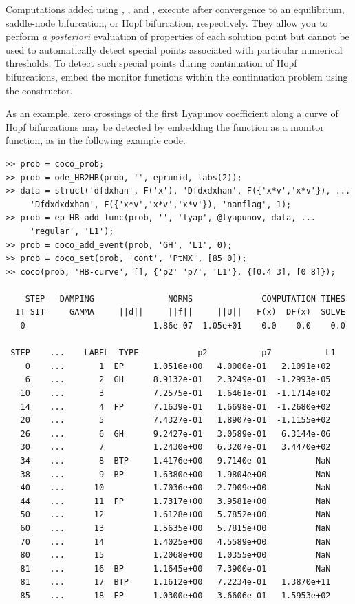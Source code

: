 Computations added using , , and ,  execute after convergence to an equilibrium, saddle-node bifurcation, or Hopf bifurcation, respectively. They allow you to perform \textit{a posteriori} evaluation of properties of each solution point but cannot be used to automatically detect special points associated with particular numerical thresholds. To detect such special points during continuation of Hopf bifurcations, embed the monitor functions within the continuation problem using the  constructor. 

As an example, zero crossings of the first Lyapunov coefficient along a curve of Hopf bifurcations may be detected by embedding the  function as a  monitor function, as in the following example code.
\begin{lstlisting}[language=coco-highlight,frame=lines]
>> prob = coco_prob;
>> prob = ode_HB2HB(prob, '', eprunid, labs(2));
>> data = struct('dfdxhan', F('x'), 'Dfdxdxhan', F({'x*v','x*v'}), ...
     'Dfdxdxdxhan', F({'x*v','x*v','x*v'}), 'nanflag', 1);
>> prob = ep_HB_add_func(prob, '', 'lyap', @lyapunov, data, ...
     'regular', 'L1');
>> prob = coco_add_event(prob, 'GH', 'L1', 0);
>> prob = coco_set(prob, 'cont', 'PtMX', [85 0]);
>> coco(prob, 'HB-curve', [], {'p2' 'p7', 'L1'}, {[0.4 3], [0 8]});

    STEP   DAMPING               NORMS              COMPUTATION TIMES
  IT SIT     GAMMA     ||d||     ||f||     ||U||   F(x)  DF(x)  SOLVE
   0                          1.86e-07  1.05e+01    0.0    0.0    0.0

 STEP    ...    LABEL  TYPE            p2           p7           L1
    0    ...       1  EP      1.0516e+00   4.0000e-01   2.1091e+02
    6    ...       2  GH      8.9132e-01   2.3249e-01  -1.2993e-05
   10    ...       3          7.2575e-01   1.6461e-01  -1.1714e+02
   14    ...       4  FP      7.1639e-01   1.6698e-01  -1.2680e+02
   20    ...       5          7.4327e-01   1.8907e-01  -1.1155e+02
   26    ...       6  GH      9.2427e-01   3.0589e-01   6.3144e-06
   30    ...       7          1.2430e+00   6.3207e-01   3.4470e+02
   34    ...       8  BTP     1.4176e+00   9.7140e-01          NaN
   38    ...       9  BP      1.6380e+00   1.9804e+00          NaN
   40    ...      10          1.7036e+00   2.7909e+00          NaN
   44    ...      11  FP      1.7317e+00   3.9581e+00          NaN
   50    ...      12          1.6128e+00   5.7852e+00          NaN
   60    ...      13          1.5635e+00   5.7815e+00          NaN
   70    ...      14          1.4025e+00   4.5589e+00          NaN
   80    ...      15          1.2068e+00   1.0355e+00          NaN
   81    ...      16  BP      1.1645e+00   7.3900e-01          NaN
   81    ...      17  BTP     1.1612e+00   7.2234e-01   1.3870e+11
   85    ...      18  EP      1.0300e+00   3.6606e-01   1.5953e+02
\end{lstlisting}
